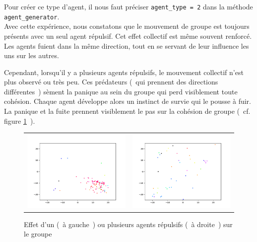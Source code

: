 \documentclass[french, a4paper, 12pt, openany]{report}
\begin{document}
       Pour créer ce type d'agent, il nous faut préciser \verb|agent_type = 2| dans la méthode \verb|agent_generator|.\\
       
       Avec cette expérience, nous constatons que le mouvement de groupe est toujours présents avec un seul agent répulsif. Cet effet collectif est même souvent renforcé. Les agents fuient dans la même direction, tout en se servant de leur influence les uns sur les autres.
       
        Cependant, lorsqu'il y a plusieurs agents répulsifs, le mouvement collectif n'est plus observé ou très peu. Ces prédateurs (~qui prennent des directions différentes~) sèment la panique au sein du groupe qui perd visiblement toute cohésion. Chaque agent développe alors un instinct de survie qui le pousse à fuir. La panique et la fuite prennent visiblement le pas sur la cohésion de groupe (~cf. figure \ref{repulsifs_agents}~).\\
       
     \begin{figure}[!h]
		\centering
		\begin{tabular}{cc}
			\includegraphics[width=8cm]{images/image_17.png} & \includegraphics[width=8cm]{images/image_16.png} \\
		\end{tabular}
		\caption{Effet d'un (~à gauche~) ou plusieurs agents répulsifs (~à droite~) sur le groupe}
		\label{repulsifs_agents}
	\end{figure}
       
\end{document}
